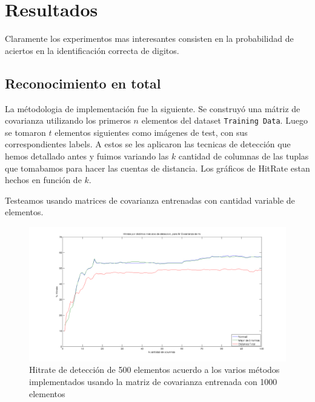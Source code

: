 \section{Resultados}

Claramente los experimentos mas interesantes consisten en la probabilidad
de aciertos en la identificaci\'on correcta de digitos.


\subsection{Reconocimiento en total}
La m\'etodologia de implementaci\'on fue la siguiente. Se construy\'o una m\'atriz de covarianza utilizando los
primeros $n$ elementos del dataset \texttt{Training Data}. Luego se tomaron $t$ elementos siguientes como
im\'agenes de test, con sus correspondientes labels. A estos se les aplicaron las tecnicas de detecci\'on
que hemos detallado antes y fuimos variando las $k$ cantidad de columnas de las tuplas que tomabamos para
hacer las cuentas de distancia. Los gr\'aficos de HitRate estan hechos en funci\'on de $k$.

Testeamos usando matrices de covarianza entrenadas con cantidad variable de elementos.

\begin{figure}[H]
\begin {center}
\includegraphics[width=500pt]{plots/hitrate-1kcv.png}
\end {center}
\caption{Hitrate de detecci\'on de 500 elementos acuerdo a los varios m\'etodos implementados
usando la matriz de covarianza entrenada con 1000 elementos}
\label{fig:HR1kcv}
\end{figure}

